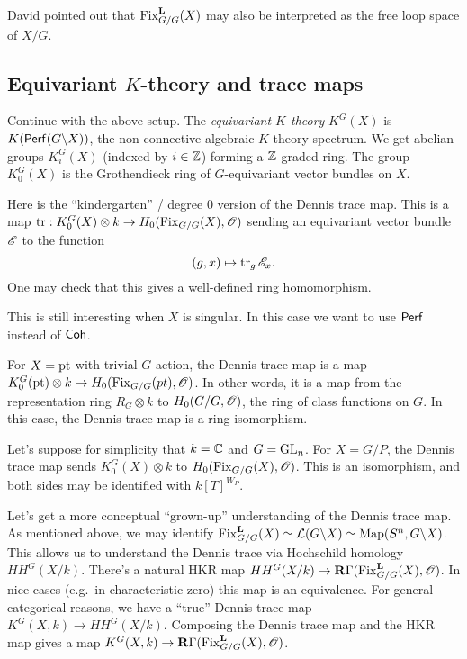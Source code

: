 \documentclass{article}
\begin{document}
\begin{rmk}
  David pointed out that $\operatorname{Fix}^{\mathbf{L}}_{G/G}(X)$ may also be interpreted as the free loop space of $X / G$.
\end{rmk}

\subsection{Equivariant $K$-theory and trace maps}

Continue with the above setup.
The \emph{equivariant $K$-theory} $K^G(X)$ is $K(\mathsf{Perf}(G \backslash X))$, the non-connective algebraic $K$-theory spectrum.
We get abelian groups $K^G_i(X)$ (indexed by $i \in \mathbb{Z}$) forming a $\mathbb{Z}$-graded ring.
The group $K^G_0(X)$ is the Grothendieck ring of $G$-equivariant vector bundles on $X$.

Here is the ``kindergarten'' / degree $0$ version of the Dennis trace map.
This is a map $\operatorname{tr}: K_0^G(X) \otimes k \to H_0(\operatorname{Fix}_{G/G}(X), \mathscr{O})$ sending an equivariant vector bundle $\mathscr{E}$ to the function
\[
  (g, x) \mapsto \operatorname{tr}_g \mathscr{E}_x.
\]
One may check that this gives a well-defined ring homomorphism.

\begin{rmk}
  This is still interesting when $X$ is singular.
  In this case we want to use $\mathsf{Perf}$ instead of $\mathsf{Coh}$.
\end{rmk}

\begin{ex}
  For $X = \operatorname{pt}$ with trivial $G$-action, the Dennis trace map is a map $K^G_0(\operatorname{pt}) \otimes k \to H_0(\operatorname{Fix}_{G/G}(pt), \mathscr{O})$.
  In other words, it is a map from the representation ring $R_G \otimes k$ to $H_0(G / G, \mathscr{O})$, the ring of class functions on $G$.
  In this case, the Dennis trace map is a ring isomorphism.
\end{ex}

\begin{ex}
  Let's suppose for simplicity that $k = \mathbb{C}$ and $G = \operatorname{GL}_n$.
  For $X = G / P$, the Dennis trace map sends $K_0^G(X) \otimes k$ to $H_0(\operatorname{Fix}_{G/G}(X), \mathscr{O})$.
  This is an isomorphism, and both sides may be identified with $k[T]^{W_P}$.
\end{ex}

Let's get a more conceptual ``grown-up'' understanding of the Dennis trace map.
As mentioned above, we may identify $\operatorname{Fix}^{\mathbf{L}}_{G/G}(X) \simeq \mathcal{L}(G \backslash X) \simeq \operatorname{Map}(S^n, G \backslash X)$.
This allows us to understand the Dennis trace via Hochschild homology $HH^G(X / k)$.
There's a natural HKR map $HH^G(X / k) \to \mathbf{R} \Gamma(\operatorname{Fix}^{\mathbf{L}}_{G/G}(X), \mathscr{O})$.
In nice cases (e.g.\ in characteristic zero) this map is an equivalence.
For general categorical reasons, we have a ``true'' Dennis trace map $K^G(X, k) \to HH^G(X / k)$.
Composing the Dennis trace map and the HKR map gives a map $K^G(X, k) \to \mathbf{R} \Gamma(\operatorname{Fix}^{\mathbf{L}}_{G/G}(X), \mathscr{O})$.
\end{document}
